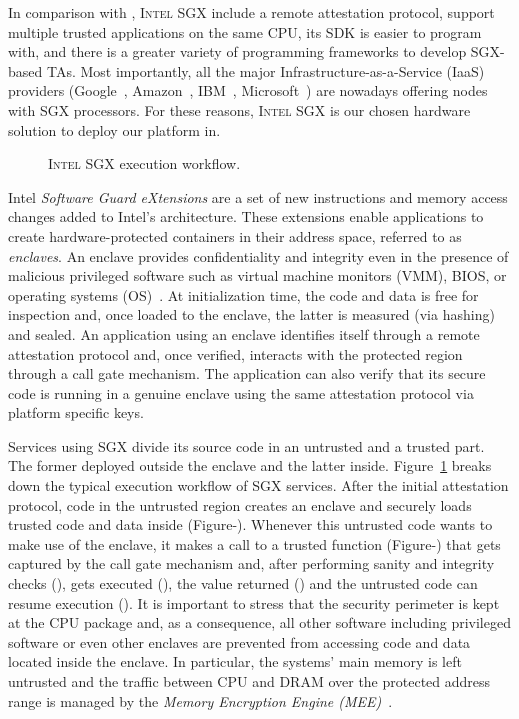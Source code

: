 In comparison with \arm \tz, \textsc{Intel SGX} include a remote attestation protocol, support multiple trusted applications on the same CPU, its SDK is easier to program with, and there is a greater variety of programming frameworks to develop SGX-based TAs.
Most importantly, all the major Infrastructure-as-a-Service (IaaS) providers (Google~\cite{gceskylake}, Amazon~\cite{amazonskylake}, IBM~\cite{ibm-sgx}, Microsoft~\cite{azureconfidential}) are nowadays offering nodes with SGX processors.
For these reasons, \textsc{Intel SGX} is our chosen hardware solution to deploy our platform in.
\begin{figure}
    \centering
    
    \caption{\textsc{Intel SGX} execution workflow.\label{fig:sgx-principles}}
\end{figure}
Intel \textit{Software Guard eXtensions} are a set of new instructions and memory access changes added to Intel's architecture.
These extensions enable applications to create hardware-protected containers in their address space, referred to as \emph{enclaves}.
An enclave provides confidentiality and integrity even in the presence of malicious privileged software such as virtual machine monitors (VMM), BIOS, or operating systems (OS)~\cite{McKeen2013}. 
At initialization time, the code and data is free for inspection and, once loaded to the enclave, the latter is measured (via hashing) and sealed. 
An application using an enclave identifies itself through a remote attestation protocol and, once verified, interacts with the protected region through a call gate mechanism.
The application can also verify that its secure code is running in a genuine enclave using the same attestation protocol via platform specific keys. %

Services using SGX divide its source code in an untrusted and a trusted part.
The former deployed outside the enclave and the latter inside.
Figure~\ref{fig:sgx-principles} breaks down the typical execution workflow of SGX services.
After the initial attestation protocol, code in the untrusted region creates an enclave and securely loads trusted code and data inside (Figure-). 
Whenever this untrusted code wants to make use of the enclave, it makes a call to a trusted function (Figure-) that gets captured by the call gate mechanism and, after performing sanity and integrity checks (), gets executed (), the value returned () and the untrusted code can resume execution ().
It is important to stress that the security perimeter is kept at the CPU package and, as a consequence, all other software including privileged software or even other enclaves are prevented from accessing code and data located inside the enclave. 
In particular, the systems' main memory is left untrusted and the traffic between CPU and DRAM over the protected address range is managed by the \textit{Memory Encryption Engine (MEE)}~\cite{Gueron16}.

